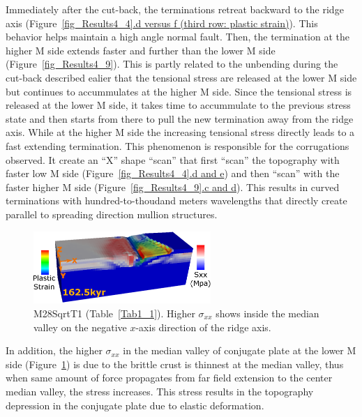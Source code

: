 Immediately after the cut-back, the terminations retreat backward to the ridge axis (Figure~\hyperref[fig_Results4_4]{\ref{fig_Results4_4}.d versus f (third row: plastic strain)}). This behavior helps maintain a high angle normal fault. Then, the termination at the higher M side extends faster and further than the lower M side (Figure~\hyperref[fig_Results4_9]{\ref{fig_Results4_9}}). This is partly related to the unbending during the cut-back described ealier that the tensional stress are released at the lower M side but continues to accummulates at the higher M side. Since the tensional stress is released at the lower M side, it takes time to accummulate to the previous stress state and then starts from there to pull the new termination away from the ridge axis. While at the higher M side the increasing tensional stress directly leads to a fast extending termination.
This phenomenon is responsible for the corrugations observed. It create an ``X'' shape ``scan'' that first ``scan'' the topography with faster low M side (Figure~\hyperref[fig_Results4_4]{\ref{fig_Results4_4}.d and e}) and then ``scan'' with the faster higher M side (Figure~\hyperref[fig_Results4_9]{\ref{fig_Results4_9}.c and d}). This results in curved terminations with hundred-to-thoudand meters wavelengths that directly create parallel to spreading direction mullion structures.    

\begin{figure}[h]
  \centering
    \includegraphics[width=0.6\textwidth]{./Figures/fig_Results4_7_sqrt_cut_back_conjugate_Sxx.eps}
  \caption{M28SqrtT1 (Table~\hyperref[Tab1_1]{\ref{Tab1_1}}). Higher $\sigma_{xx}$ shows inside the median valley on the negative $x$-axis direction of the ridge axis. }
 \label{fig_Results4_7}
\end{figure}

In addition, the higher $\sigma_{xx}$ in the median valley of conjugate plate at the lower M side (Figure~\hyperref[fig_Results4_7]{\ref{fig_Results4_7}}) is due to the brittle crust is thinnest at the median valley, thus when same amount of force propagates from far field extension to the center median valley, the stress increases. This stress results in the topography depression in the conjugate plate due to elastic deformation.     

